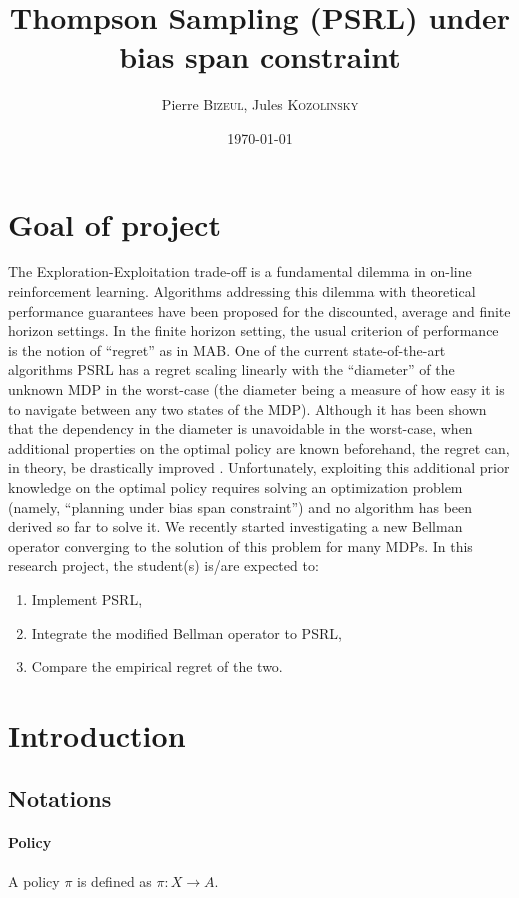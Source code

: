 \documentclass[a4paper,10pt]{article}
\title{Thompson Sampling (PSRL) under bias span constraint}
\author{Pierre \textsc{Bizeul}, Jules \textsc{Kozolinsky} }
\date\today
\begin{document}
\maketitle
\tableofcontents

\section{Goal of project}
The Exploration-Exploitation trade-off is a fundamental dilemma in on-line reinforcement learning. Algorithms addressing this dilemma with theoretical performance guarantees have been proposed for the discounted, average and finite horizon settings. In the finite horizon setting, the usual criterion of performance is the notion of “regret” as in MAB. One of the current state-of-the-art algorithms PSRL \cite{osband2013more}  has a regret scaling linearly with the “diameter” of the unknown MDP in the worst-case (the diameter being a measure of how easy it is to navigate between any two states of the MDP). Although it has been shown that the dependency in the diameter is unavoidable in the worst-case, when additional properties on the optimal policy are known beforehand, the regret can, in theory, be drastically improved \cite{bartlett2009regal}. Unfortunately, exploiting this additional prior knowledge on the optimal policy requires solving an optimization problem (namely, “planning under bias span constraint”) and no algorithm has been derived so far to solve it. We recently started investigating a new Bellman operator converging to the solution of this problem for many MDPs. In this research project, the student(s) is/are expected to:
\begin{enumerate}
\item  Implement PSRL,
\item  Integrate the modified Bellman operator to PSRL,
\item Compare the empirical regret of the two.
\end{enumerate}

\section{Introduction}
\subsection{Notations}
\paragraph{Policy\\}
A policy $\pi$ is defined as $\pi: X \rightarrow A$.
\end{document}

